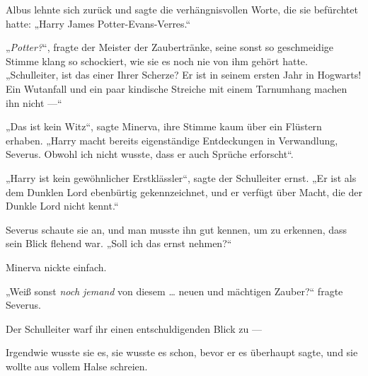 Albus lehnte sich zurück und sagte die verhängnisvollen Worte, die sie befürchtet hatte:
„Harry James Potter-Evans-Verres.“

„\emph{Potter?}“, fragte der Meister der Zaubertränke, seine sonst so geschmeidige Stimme klang so schockiert, wie sie es noch nie von ihm gehört hatte.
„Schulleiter, ist das einer Ihrer Scherze? Er ist in seinem ersten Jahr in Hogwarts! Ein Wutanfall und ein paar kindische Streiche mit einem Tarnumhang machen ihn nicht —“

„Das ist kein Witz“, sagte Minerva, ihre Stimme kaum über ein Flüstern erhaben.
„Harry macht bereits eigenständige Entdeckungen in Verwandlung, Severus. Obwohl ich nicht wusste, dass er auch Sprüche erforscht“.

„Harry ist kein gewöhnlicher Erstklässler“, sagte der Schulleiter ernst.
„Er ist als dem Dunklen Lord ebenbürtig gekennzeichnet, und er verfügt über Macht, die der Dunkle Lord nicht kennt.“

Severus schaute sie an, und man musste ihn gut kennen, um zu erkennen, dass sein Blick flehend war.
„Soll ich das ernst nehmen?“

Minerva nickte einfach.

„Weiß sonst \emph{noch} \emph{jemand} von diesem … neuen und mächtigen Zauber?“ fragte Severus.

Der Schulleiter warf ihr einen entschuldigenden Blick zu —

Irgendwie wusste sie es, sie wusste es schon, bevor er es überhaupt sagte, und sie wollte aus vollem Halse schreien.

